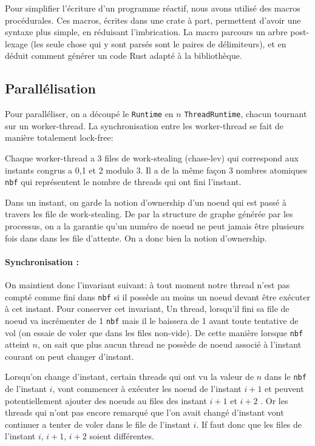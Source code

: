 \documentclass[a4paper]{article}
\renewcommand{\(}{\left(}
\renewcommand{\)}{\right)}
\begin{document}
Pour simplifier l'écriture d'un programme réactif, nous avons utilisé des macros
procédurales. Ces macros, écrites dans une crate à part, permettent d'avoir une
syntaxe plus simple, en réduisant l'imbrication. La macro parcours un arbre
post-lexage (les seule chose qui y sont parsés sont le paires de délimiteurs),
et en déduit comment générer un code Rust adapté à la bibliothèque.

\subsection{Parallélisation}

Pour paralléliser, on a découpé le \verb!Runtime! en $n$ \verb!ThreadRuntime!,
chacun tournant sur un worker-thread. La synchronisation entre les worker-thread
se fait de manière totalement lock-free:

Chaque worker-thread a 3 files de work-stealing (chase-lev) qui correspond aux
instants congrus a 0,1 et 2 modulo 3. Il a de la même façon 3 nombres atomiques \verb!nbf! qui
représentent le nombre de threads qui ont fini l'instant.

Dans un instant, on garde la notion d'ownership d'un noeud qui est passé à
travers les file de work-stealing. De par la structure de graphe générée par les
processus, on a la garantie qu'un numéro de noeud ne peut jamais être plusieurs
fois dans dans les file d'attente. On a donc bien la notion d'ownership.

\paragraph{Synchronisation :} On maintient donc l'invariant suivant: à tout
moment notre thread n'est pas compté comme
fini dans \verb!nbf! si il possède au moins un noeud devant être exécuter à cet
instant. Pour conserver cet invariant, Un thread, lorsqu'il fini sa
file de noeud va incrémenter de 1 \verb!nbf! mais il le baissera de 1 avant
toute tentative de vol (on essaie de voler que dans les files non-vide). De cette
manière lorsque \verb!nbf! atteint $n$, on sait que plus aucun thread ne possède
de noeud associé à l'instant courant on peut changer d'instant.

Lorsqu'on change d'instant, certain threads qui ont \og vu\fg{} la valeur de $n$
dans le \verb!nbf! de l'instant $i$, vont commencer à exécuter les noeud de l'instant $i+1$ et
peuvent potentiellement ajouter des noeuds au files des instant $i+1$ et $i+2$ .
Or les threads qui n'ont pas encore remarqué que l'on avait changé d'instant
vont continuer a tenter de voler dans le file de l'instant $i$. If faut donc que
les files de l'instant $i$, $i+1$, $i+2$ soient différentes.
\end{document}
